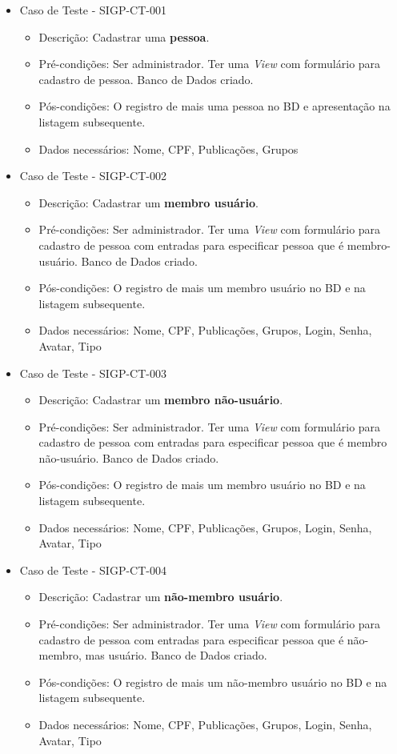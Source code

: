 \documentclass[11pt, a4paper]{book}
\begin{document}
\begin{itemize}
	\item Caso de Teste - SIGP-CT-001
	\begin{itemize}
	\item Descrição: Cadastrar uma \textbf{pessoa}.
	\item Pré-condições: Ser administrador. Ter uma \emph{View} com formulário para cadastro de pessoa. Banco de Dados criado.
	\item Pós-condições: O registro de mais uma pessoa no BD e apresentação na listagem subsequente.
	\item Dados necessários: Nome, CPF, Publicações, Grupos
	\end{itemize}

	\item  Caso de Teste - SIGP-CT-002 
	\begin{itemize}
	\item Descrição: Cadastrar um \textbf{membro usuário}.
	\item Pré-condições: Ser administrador. Ter uma \emph{View} com formulário para cadastro de pessoa com entradas para especificar pessoa que é membro-usuário. Banco de Dados criado.
	\item Pós-condições: O registro de mais um membro usuário no BD e na listagem subsequente.
	\item Dados necessários: Nome, CPF, Publicações, Grupos, Login, Senha, Avatar, Tipo
	\end{itemize}

	\item Caso de Teste - SIGP-CT-003
	\begin{itemize}
	\item Descrição: Cadastrar um \textbf{membro não-usuário}.
	\item Pré-condições: Ser administrador. Ter uma \emph{View} com formulário para cadastro de pessoa com entradas para especificar pessoa que é membro não-usuário. Banco de Dados criado.
	\item Pós-condições: O registro de mais um membro usuário no BD e na listagem subsequente.
	\item Dados necessários: Nome, CPF, Publicações, Grupos, Login, Senha, Avatar, Tipo
	\end{itemize}

\newpage

	\item Caso de Teste - SIGP-CT-004
	\begin{itemize}
	\item Descrição: Cadastrar um \textbf{não-membro usuário}.
	\item Pré-condições: Ser administrador. Ter uma \emph{View} com formulário para cadastro de pessoa com entradas para especificar pessoa que é não-membro, mas usuário. Banco de Dados criado.
	\item Pós-condições: O registro de mais um não-membro usuário no BD e na listagem subsequente.
	\item Dados necessários:  Nome, CPF, Publicações, Grupos, Login, Senha, Avatar, Tipo
	\end{itemize}


\end{itemize}
\end{document}
